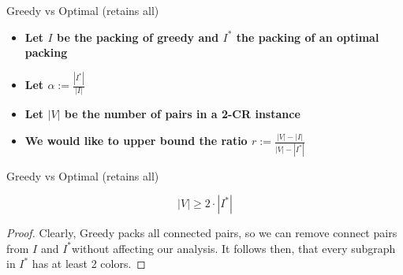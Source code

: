 \begin{frame}{Greedy vs Optimal (retains all)}
\begin{itemize}

\item \textbf<1>
{Let $I$ be the packing of greedy and $I^*$ the packing of an optimal packing}

\item \textbf<2>
{Let $\alpha := \frac{|I^*|}{|I|}$ }

\item \textbf<3>
{Let $|V|$ be the number of pairs in a 2-CR instance}

\item \textbf<4>
{We would like to upper bound the ratio $r := \frac{|V| - |I|}{|V| - |I^*|}$}

\end{itemize}
\end{frame}


\begin{frame}{Greedy vs Optimal (retains all)}
	
\begin{lemma}
$$ |V| \geq 2 \cdot |I^*| $$
\end{lemma}

\begin{proof}
Clearly, Greedy packs all connected pairs, so we can remove connect pairs 
from $I$ and $I^*$without affecting our analysis. 
It follows then, that every subgraph in $I^*$ has at least 2 colors. 
\end{proof}

\end{frame}

